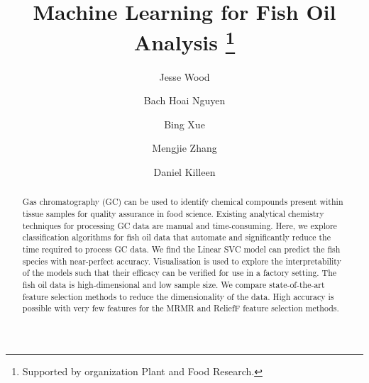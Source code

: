 \documentclass[runningheads]{llncs}
\begin{document}
%
\title{Machine Learning for Fish Oil Analysis \thanks{Supported by organization Plant and Food Research.}}
%
%
\author{Jesse Wood \and
  Bach Hoai Nguyen \and
  Bing Xue \and 
  Mengjie Zhang \and 
  Daniel Killeen
}
%
%

%
\maketitle              %
%
\begin{abstract}
  
  Gas chromatography (GC) can be used to identify chemical compounds present within tissue samples for quality assurance in food science.
  Existing analytical chemistry techniques for processing GC data are manual and time-consuming.
  Here, we explore classification algorithms for fish oil data that automate and significantly reduce the time required to process GC data.
  We find the Linear SVC model can predict the fish species with near-perfect accuracy.
  Visualisation is used to explore the interpretability of the models such that their efficacy can be verified for use in a factory setting.
  The fish oil data is high-dimensional and low sample size.
  We compare state-of-the-art feature selection methods to reduce the dimensionality of the data.
  High accuracy is possible with very few features for the MRMR and ReliefF feature selection methods.
  
\end{abstract}
%
%
%
\end{document}
